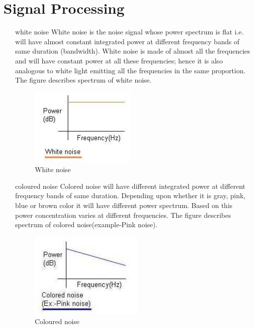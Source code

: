 \chapter{Signal Processing}
\begin{itemize}
\item[white noise]White noise is the noise signal whose power spectrum is flat i.e. will have almost constant integrated power at different frequency bands of same duration (bandwidth). White noise is made of almost all the frequencies and will have constant power at all these frequencies; hence it is also analogous to white light emitting all the frequencies in the same proportion. The figure describes spectrum of white noise.
\begin{figure}[h!]
  \centering
  \includegraphics[scale=0.45]{images/I/wn.png}
  \caption{White noise}\label{fig:wn}
\end{figure}

\item[coloured noise]Colored noise will have different integrated power at different frequency bands of same duration. Depending upon whether it is gray, pink, blue or brown color it will have different power spectrum. Based on this power concentration varies at different frequencies. The figure describes spectrum of colored noise(example-Pink noise).
\begin{figure}[h!]
  \centering
  \includegraphics[scale=0.45]{images/I/cn.png}
  \caption{Coloured noise}\label{fig:cn}
\end{figure}



\end{itemize}
